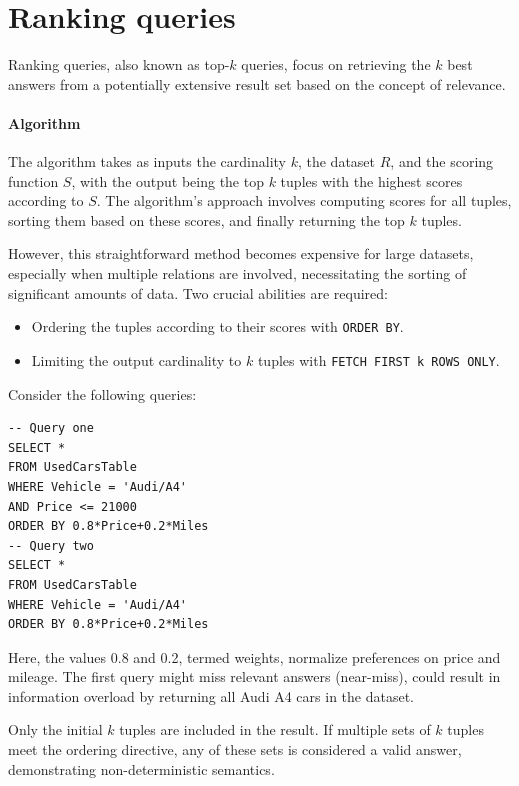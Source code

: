 \section{Ranking queries}

Ranking queries, also known as top-$k$ queries, focus on retrieving the $k$ best answers from a potentially extensive result set based on the concept of relevance.

\paragraph*{Algorithm}
The algorithm takes as inputs the cardinality $k$, the dataset $R$, and the scoring function $S$, with the output being the top $k$ tuples with the highest scores according to $S$.
The algorithm's approach involves computing scores for all tuples, sorting them based on these scores, and finally returning the top $k$ tuples.

However, this straightforward method becomes expensive for large datasets, especially when multiple relations are involved, necessitating the sorting of significant amounts of data.
Two crucial abilities are required: 
\begin{itemize}
    \item Ordering the tuples according to their scores with \texttt{ORDER BY}.
    \item Limiting the output cardinality to $k$ tuples with \texttt{FETCH FIRST k ROWS ONLY}.
\end{itemize} 
\begin{example}
    Consider the following queries: 
    \begin{lstlisting}[style=SQL]
-- Query one
SELECT *
FROM UsedCarsTable
WHERE Vehicle = 'Audi/A4'
AND Price <= 21000
ORDER BY 0.8*Price+0.2*Miles
-- Query two
SELECT *
FROM UsedCarsTable
WHERE Vehicle = 'Audi/A4'
ORDER BY 0.8*Price+0.2*Miles
    \end{lstlisting}
    Here, the values 0.8 and 0.2, termed weights, normalize preferences on price and mileage.
    The first query might miss relevant answers (near-miss), could result in information overload by returning all Audi A4 cars in the dataset.
\end{example}
Only the initial $k$ tuples are included in the result. 
If multiple sets of $k$ tuples meet the ordering directive, any of these sets is considered a valid answer, demonstrating non-deterministic semantics.

